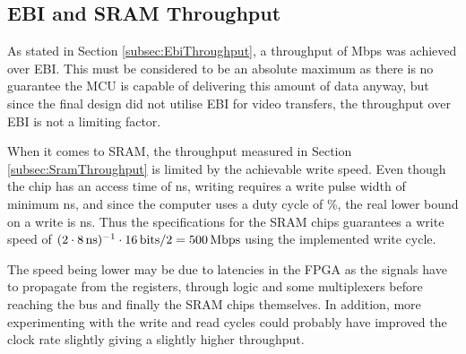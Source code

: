 \subsection{EBI and SRAM Throughput}
As stated in Section \ref{subsec:EbiThroughput}, a throughput of \unit[384]{Mbps} was achieved over EBI.
This must be considered to be an absolute maximum as there is no guarantee the MCU is capable of delivering this amount of data anyway, but since the final design did not utilise EBI for video transfers, the throughput over EBI is not a limiting factor.

When it comes to SRAM, the throughput measured in Section \ref{subsec:SramThroughput} is limited by the achievable write speed.
Even though the chip has an access time of \unit[10]{ns}, writing requires a write pulse width of minimum \unit[8]{ns}, and since the computer uses a duty cycle of \unit[50]{\%}, the real lower bound on a write is \unit[16]{ns}.
Thus the specifications for the SRAM chips guarantees a write speed of $(2\cdot\unit[8]{ns})^{-1} \cdot \unit[16]{bits} / 2 = \unit[500]{Mbps}$ using the implemented write cycle.

The speed being lower may be due to latencies in the FPGA as the signals have to propagate from the registers, through logic and some multiplexers before reaching the bus and finally the SRAM chips themselves. In addition, more experimenting with the write and read cycles could probably have improved the clock rate slightly giving a slightly higher throughput.
